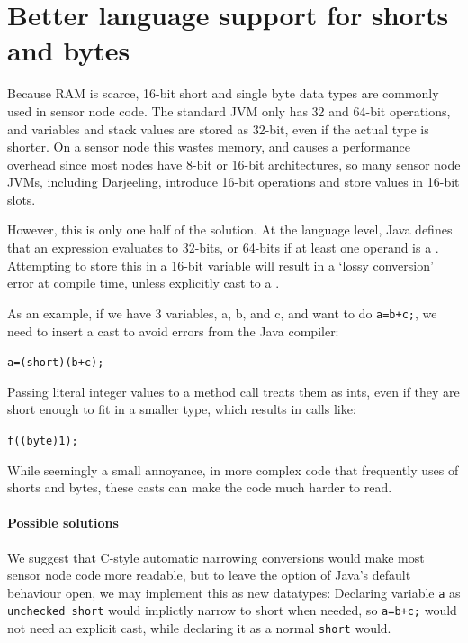 \section{Better language support for shorts and bytes}
\label{sec-small-datatypes}
Because RAM is scarce, 16-bit short and single byte data types are commonly used in sensor node code. The standard JVM only has 32 and 64-bit operations, and variables and stack values are stored as 32-bit, even if the actual type is shorter. On a sensor node this wastes memory, and causes a performance overhead since most nodes have 8-bit or 16-bit architectures, so many sensor node JVMs, including Darjeeling, introduce 16-bit operations and store values in 16-bit slots.

However, this is only one half of the solution. At the language level, Java defines that an expression evaluates to 32-bits, or 64-bits if at least one operand is a . Attempting to store this in a 16-bit variable will result in a `lossy conversion' error at compile time, unless explicitly cast to a .

As an example, if we have 3  variables, a, b, and c, and want to do 
\texttt{a=b+c;}, we need to insert a cast to avoid errors from the Java compiler:

\texttt{a=(short)(b+c);}

Passing literal integer values to a method call treats them as ints, even if they are short enough to fit in a smaller type, which results in calls like: 

\texttt{f((byte)1);}

While seemingly a small annoyance, in more complex code that frequently uses of shorts and bytes, these casts can make the code much harder to read.

\paragraph{Possible solutions}

We suggest that C-style automatic narrowing conversions would make most sensor node code more readable, but to leave the option of Java's default behaviour open, we may implement this as new datatypes: Declaring variable \texttt{a} as \texttt{unchecked short} would implictly narrow to short when needed, so \texttt{a=b+c;} would not need an explicit cast, while declaring it as a normal \texttt{short} would.




